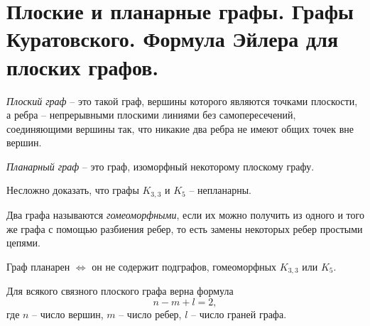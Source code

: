 \newpage

\section{Плоские и планарные графы. Графы Куратовского. Формула Эйлера для плоских графов.}

\begin{definition}
    \emph{Плоский граф} -- это такой граф, вершины которого являются точками плоскости, а ребра -- непрерывными плоскими линиями без самопересечений, соединяющими вершины так, что никакие два ребра не имеют общих точек вне вершин.

    \emph{Планарный граф} -- это граф, изоморфный некоторому плоскому графу.
    \begin{figure}[H]
        \centering
        \label{fig:fig_23}
    \end{figure}
\end{definition}

\begin{remark}
    Несложно доказать, что графы $ K_{3,3} $ и $ K_5 $ -- непланарны.
    \begin{figure}[H]
        \centering
        \label{fig:fig_24}
    \end{figure}
\end{remark}

\begin{definition}
    Два графа называются \emph{гомеоморфными}, если их можно получить из одного и того же графа с помощью разбиения ребер, то есть замены некоторых ребер простыми цепями.
\end{definition}

\begin{theorem}
    Граф планарен $ \iff $ он не содержит подграфов, гомеоморфных $ K_{3,3} $ или $ K_5 $.
\end{theorem}

\begin{theorem}
    Для всякого связного плоского графа верна формула
    \begin{equation}\label{eq:2}
        n-m+l=2,
    \end{equation}
    где $ n $ -- число вершин, $ m $ -- число ребер, $ l $ -- число граней графа.
\end{theorem}

